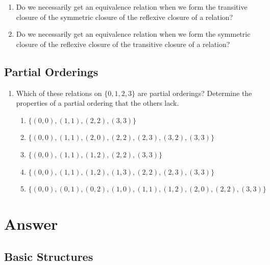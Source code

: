 \documentclass{sig-alternate-05-2015}
\begin{document}
\begin{enumerate}
\item Do we necessarily get an equivalence relation when we
form the transitive closure of the symmetric closure of
the reflexive closure of a relation?

\item Do we necessarily get an equivalence relation when we
form the symmetric closure of the reflexive closure of the
transitive closure of a relation?
\end{enumerate}

\subsection{Partial Orderings}
\begin{enumerate}
\item Which of these relations on $\{0, 1, 2, 3\}$ are partial orderings? Determine the properties of a partial ordering that
the others lack.
	\begin{enumerate}
		\item $\{(0, 0), (1, 1), (2, 2), (3, 3)\}$ 
		\item $\{(0, 0), (1, 1), (2, 0), (2, 2), (2, 3), (3, 2), (3, 3)\}$
		\item $\{(0, 0), (1, 1), (1, 2), (2, 2), (3, 3)\}$
		\item $\{(0, 0), (1, 1), (1, 2), (1, 3), (2, 2), (2, 3), (3, 3)\}$
		\item $\{(0, 0), (0, 1), (0, 2), (1, 0), (1, 1), (1, 2), (2, 0), (2, 2), (3, 3)\}$
	\end{enumerate}

\end{enumerate}

\nocite{*}

 
\newpage
\appendix
\section{Answer}
\subsection{Basic Structures}
\end{document}
